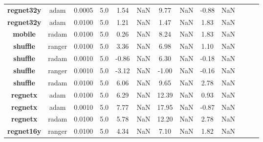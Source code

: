 \begin{table}
\begin{tabular}{c|c|c|c|c|c|c|c|c|c|c|c|c|}
\textbf{regnet32y} &    adam &  0.0005 &         5.0 &                     1.54 &                     NaN &                    9.77 &                    NaN &                   -0.88 &                     NaN \\
\textbf{regnet32y} &    adam &  0.0100 &         5.0 &                     1.21 &                     NaN &                    1.47 &                    NaN &                    1.83 &                     NaN \\
\textbf{mobile   } &   radam &  0.0100 &         5.0 &                     0.26 &                     NaN &                    8.24 &                    NaN &                    1.83 &                     NaN \\
\textbf{shuffle  } &  ranger &  0.0100 &         5.0 &                     3.36 &                     NaN &                    6.98 &                    NaN &                    1.10 &                     NaN \\
\textbf{shuffle  } &   radam &  0.0010 &         5.0 &                    -0.86 &                     NaN &                    6.30 &                    NaN &                   -0.18 &                     NaN \\
\textbf{shuffle  } &  ranger &  0.0010 &         5.0 &                    -3.12 &                     NaN &                   -1.00 &                    NaN &                   -0.16 &                     NaN \\
\textbf{shuffle  } &   radam &  0.0100 &         5.0 &                     6.06 &                     NaN &                    9.65 &                    NaN &                    2.78 &                     NaN \\
\textbf{regnetx  } &    adam &  0.0100 &         5.0 &                     6.29 &                     NaN &                   12.39 &                    NaN &                    0.93 &                     NaN \\
\textbf{regnetx  } &    adam &  0.0010 &         5.0 &                     7.77 &                     NaN &                   17.95 &                    NaN &                   -0.87 &                     NaN \\
\textbf{regnetx  } &   radam &  0.0100 &         5.0 &                     5.78 &                     NaN &                   12.20 &                    NaN &                    2.78 &                     NaN \\
\textbf{regnet16y} &  ranger &  0.0100 &         5.0 &                     4.34 &                     NaN &                    7.10 &                    NaN &                    1.82 &                     NaN \\

\end{tabular}
\end{table}
